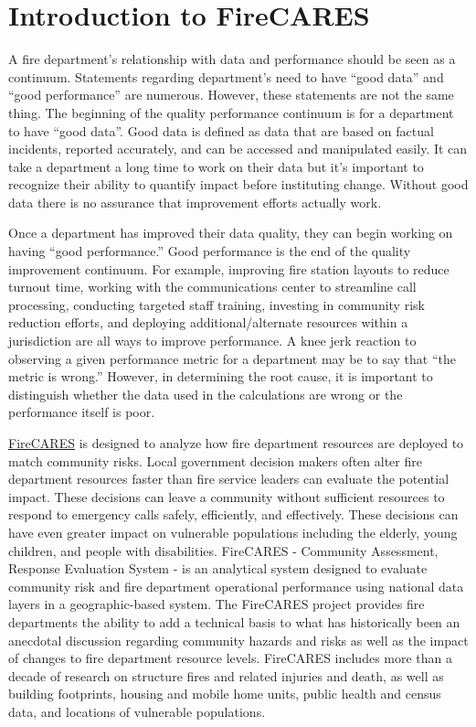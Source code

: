 \documentclass[12pt,oneside]{book}
\begin{document}
\newpage
\mainmatter

\chapter{Introduction to FireCARES}
A fire department's relationship with data and performance should be seen as a continuum. Statements regarding department's need to have ``good data'' and ``good performance'' are numerous. However, these statements are not the same thing. The beginning of the quality performance continuum is for a department to have ``good data''. Good data is defined as data that are based on factual incidents, reported accurately, and can be accessed and manipulated easily. It can take a department a long time to work on their data but it's important to recognize their ability to quantify impact before instituting change. Without good data there is no assurance that improvement efforts actually work.

Once a department has improved their data quality, they can begin working on having ``good performance.'' Good performance is the end of the quality improvement continuum. For example, improving fire station layouts to reduce turnout time, working with the communications center to streamline call processing, conducting targeted staff training, investing in community risk reduction efforts, and deploying additional/alternate resources within a jurisdiction are all ways to improve performance. 
A knee jerk reaction to observing a given performance metric for a department may be to say that ``the metric is wrong.'' However, in determining the root cause, it is important to distinguish whether the data used in the calculations are wrong or the performance itself is poor.  

\href{https://firecares.org}{FireCARES} is designed to analyze how fire department resources are deployed to match community risks. Local government decision makers often alter fire department resources faster than fire service leaders can evaluate the potential impact. These decisions can leave a community without sufficient resources to respond to emergency calls safely, efficiently, and effectively. These decisions can have even greater impact on vulnerable populations including the elderly, young children, and people with disabilities. FireCARES - Community Assessment, Response Evaluation System - is an analytical system designed to evaluate community risk and fire department operational performance using national data layers in a geographic-based system. The FireCARES project provides fire departments the ability to add a technical basis to what has historically been an anecdotal discussion regarding community hazards and risks as well as the impact of changes to fire department resource levels. FireCARES includes more than a decade of research on structure fires and related injuries and death, as well as building footprints, housing and mobile home units, public health and census data, and locations of vulnerable populations.
\end{document}
